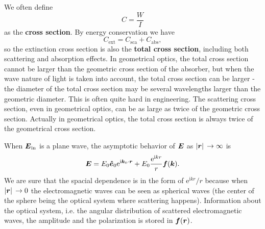 \documentclass[hyperref, a4paper]{article}
\newcommand*{\ii}{\mathrm{i}}
\newcommand*{\ee}{\mathrm{e}}
\newcommand*{\concept}[1]{{\textbf{#1}}}
\begin{document}
We often define 
\begin{equation}
    C = \frac{W}{I}
\end{equation}
as the \concept{cross section}. By energy conservation we have 
\begin{equation}
    C_\text{ext} = C_\text{sca} + C_\text{abs},
\end{equation}
so the extinction cross section is also the \concept{total cross section}, including both scattering 
and absorption effects. In geometrical optics, the total cross section cannot be larger than the geometric
cross section of the absorber, but when the wave nature of light is taken into account, the total cross 
section can be larger - the diameter of the total cross section may be several wavelengths larger than the 
geometric diameter. This is often quite hard in engineering. The scattering cross section, even in geometrical
optics, can be as large as twice of the geometric cross section. Actually in geometrical optics, 
the total cross section is always twice of the geometrical cross section. %

When $\vb*{E}_\text{in}$ is a plane wave, the asymptotic behavior of $\vb*{E}$ as $\abs*{\vb*{r}} \to \infty$ is 
\begin{equation}
    \vb*{E} = E_0 \vu*{e}_0 \ee^{\ii \vb*{k}_0 \cdot \vb*{r}} + E_0 \frac{\ee^{\ii k r}}{r} \vb*{f}(\vb*{k}).
\end{equation}
We are sure that the spacial dependence is in the form of $\ee^{\ii k r} / r$ because when $\abs*{\vb*{r}} \to 0$
the electromagnetic waves can be seen as spherical waves (the center of the sphere being the optical system where 
scattering happens). Information about the optical system, i.e. the angular distribution of scattered 
electromagnetic waves, the amplitude and the polarization is stored in $\vb*{f}(\vb*{r})$.
\end{document}
